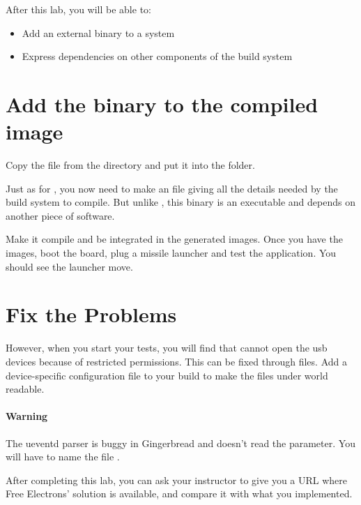 
After this lab, you will be able to:
\begin{itemize}
  \item Add an external binary to a system
  \item Express dependencies on other components of the build system
\end{itemize}

\section{Add the binary to the compiled image}
Copy the  file from the
 directory and put it
into the  folder.

Just as for , you now need to make an  file
giving all the details needed by the build system to compile. But
unlike , this binary is an executable and depends on another
piece of software.

Make it compile and be integrated in the generated images. Once you
have the images, boot the board, plug a missile launcher and test the
application. You should see the launcher move.

\section{Fix the Problems}

However, when you start your tests, you will find that  cannot open
the usb devices because of restricted permissions. This can be fixed
through  files. Add a device-specific 
configuration file to your build to make the files under
 world readable.

\paragraph{Warning} The ueventd parser is buggy in Gingerbread and
doesn't read the  parameter. You will have
to name the file .

After completing this lab, you can ask your instructor to
give you a URL where Free Electrons' solution is available, and compare
it with what you implemented.
